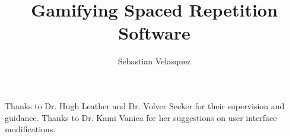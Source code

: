 \documentclass[msc, ai, logo, oneside, fullpacing]{infthesis}
\title{Gamifying Spaced Repetition Software}
\author{Sebastian Velasquez}
\begin{document}
\begin{preliminary}

\maketitle

\begin{acknowledgements}
Thanks to Dr. Hugh Leather and Dr. Volver Seeker for their supervision and guidance. Thanks to Dr. Kami Vaniea for her suggestions on user interface modifications.
\end{acknowledgements}

\standarddeclaration


\tableofcontents

\listoffigures
\listoftables

\end{preliminary}









\appendix
% 






\end{document}
